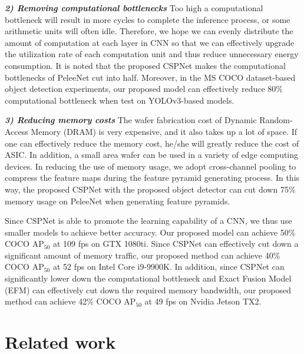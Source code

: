 \documentclass{article}
\begin{document}
\textit{\textbf{2) Removing computational bottlenecks }} Too high a computational bottleneck will result in more cycles to complete the inference process, or some arithmetic units will often idle.  Therefore, we hope we can evenly distribute the amount of computation at each layer in CNN so that we can effectively upgrade the utilization rate of each computation unit and thus reduce unnecessary energy consumption.  It is noted that the proposed CSPNet makes the computational bottlenecks of PeleeNet \cite{wang2018pelee} cut into half.  Moreover, in the MS COCO \cite{lin2014microsoft} dataset-based object detection experiments, our proposed model can effectively reduce 80\% computational bottleneck when test on YOLOv3-based models.

\textit{\textbf{3) Reducing memory costs }} The wafer fabrication cost of Dynamic Random-Access Memory (DRAM) is very expensive, and it also takes up a lot of space.  If one can effectively reduce the memory cost, he/she will greatly reduce the cost of ASIC.  In addition, a small area wafer can be used in a variety of edge computing devices.  In reducing the use of memory usage, we adopt cross-channel pooling \cite{goodfellow2013maxout} to compress the feature maps during the feature pyramid generating process.  In this way, the proposed CSPNet with the proposed object detector can cut down 75\% memory usage on PeleeNet when generating feature pyramids.

Since CSPNet is able to promote the learning capability of a CNN, we thus use smaller models to achieve better accuracy.  Our proposed model can achieve 50\% COCO AP$_{50}$ at 109 fps on GTX 1080ti.  Since CSPNet can effectively cut down a significant amount of memory traffic, our proposed method can achieve 40\% COCO AP$_{50}$ at 52 fps on Intel Core i9-9900K.  In addition, since CSPNet can significantly lower down the computational bottleneck and Exact Fusion Model (EFM) can effectively cut down the required memory bandwidth, our proposed method can achieve 42\% COCO AP$_{50}$ at 49 fps on Nvidia Jetson TX2.

\section{Related work}
\end{document}
